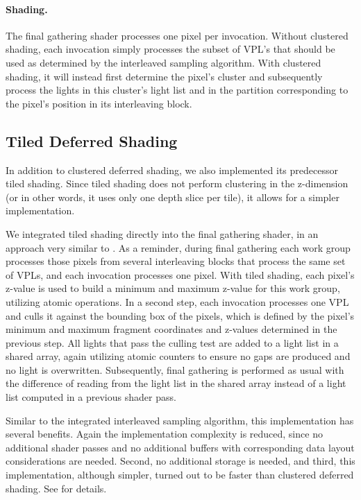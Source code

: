 \paragraph{Shading.}
The final gathering shader processes one pixel per invocation. Without clustered shading, each invocation simply processes the subset of VPL's that should be used as determined by the interleaved sampling algorithm. With clustered shading, it will instead first determine the pixel's cluster and subsequently process the lights in this cluster's light list and in the partition corresponding to the pixel's position in its interleaving block.


\subsection{Tiled Deferred Shading}

In addition to clustered deferred shading, we also implemented its predecessor tiled shading. Since tiled shading does not perform clustering in the z-dimension (or in other words, it uses only one depth slice per tile), it allows for a simpler implementation.

We integrated tiled shading directly into the final gathering shader, in an approach very similar to \citet{Andersson:2011:RenderingBattlefield3}. As a reminder, during final gathering each work group processes those pixels from several interleaving blocks that process the same set of VPLs, and each invocation processes one pixel. With tiled shading, each pixel's z-value is used to build a minimum and maximum z-value for this work group, utilizing atomic operations. In a second step, each invocation processes one VPL and culls it against the bounding box of the pixels, which is defined by the pixel's minimum and maximum fragment coordinates and z-values determined in the previous step. All lights that pass the culling test are added to a light list in a shared array, again utilizing atomic counters to ensure no gaps are produced and no light is overwritten. Subsequently, final gathering is performed as usual with the difference of reading from the light list in the shared array instead of a light list computed in a previous shader pass.

Similar to the integrated interleaved sampling algorithm, this implementation has several benefits. Again the implementation complexity is reduced, since no additional shader passes and no additional buffers with corresponding data layout considerations are needed. Second, no additional storage is needed, and third, this implementation, although simpler, turned out to be faster than clustered deferred shading. See  for details.
